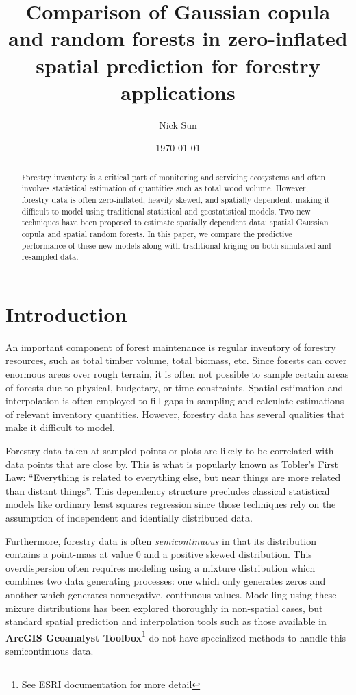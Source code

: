 \documentclass{article}
\title{\vspace{-2.0cm}Comparison of Gaussian copula and random forests in zero-inflated spatial prediction for forestry applications}
\date{\today}
\author{Nick Sun}
\affil{Oregon State University, Department of Statistics}
\begin{document}
\maketitle

\begin{abstract}
	Forestry inventory is a critical part of monitoring and servicing ecosystems and often involves statistical estimation of quantities such as total wood volume.
	However, forestry data is often zero-inflated, heavily skewed, and spatially dependent, making it difficult to model using traditional statistical and geostatistical models.
	Two new techniques have been proposed to estimate spatially dependent data: spatial Gaussian copula and spatial random forests.
	In this paper, we compare the predictive performance of these new models along with traditional kriging on both simulated and resampled data.
\end{abstract}

\section{Introduction}
An important component of forest maintenance is regular inventory of forestry resources, such as total timber volume, total biomass, etc.
Since forests can cover enormous areas over rough terrain, it is often not possible to sample certain areas of forests due to physical, budgetary, or time constraints.
Spatial estimation and interpolation is often employed to fill gaps in sampling and calculate estimations of relevant inventory quantities.
However, forestry data has several qualities that make it difficult to model.

Forestry data taken at sampled points or plots are likely to be correlated with data points that are close by.
This is what is popularly known as Tobler's First Law: ``Everything is related to everything else, but near things are more related than distant things''\cite{miller04}.
This dependency structure precludes classical statistical models like ordinary least squares regression since those techniques rely on the assumption of independent and identially distributed data.

Furthermore, forestry data is often \textit{semicontinuous} in that its distribution contains a point-mass at value 0 and a positive skewed distribution\cite{mills13}.
This overdispersion often requires modeling using a mixture distribution which combines two data generating processes: one which only generates zeros and another which generates nonnegative, continuous values.
Modelling using these mixure distributions has been explored thoroughly in non-spatial cases, but standard spatial prediction and interpolation tools such as those available in \textbf{ArcGIS Geoanalyst Toolbox}\footnote{See ESRI documentation for more detail} do not have specialized methods to handle this semicontinuous data.
\end{document}
